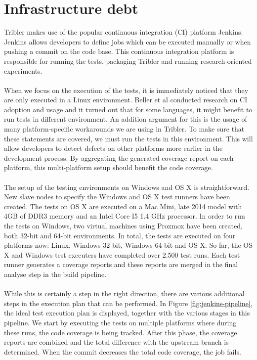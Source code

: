 \section{Infrastructure debt}
Tribler makes use of the popular continuous integration (CI) platform Jenkins. Jenkins allows developers to define jobs which can be executed manually or when pushing a commit on the code base. This continuous integration platform is responsible for running the tests, packaging Tribler and running research-oriented experiments.\\\\
When we focus on the execution of the tests, it is immediately noticed that they are only executed in a Linux environment. Beller et al\cite{beller2016oops} conducted research on CI adoption and usage and it turned out that for some languages, it might benefit to run tests in different environment. An addition argument for this is the usage of many platform-specific workarounds we are using in Tribler. To make sure that these statements are covered, we must run the tests in this environment. This will allow developers to detect defects on other platforms more earlier in the development process. By aggregating the generated coverage report on each platform, this multi-platform setup should benefit the code coverage.\\\\
The setup of the testing environments on Windows and OS X is straightforward. New slave nodes to specify the Windows and OS X test runners have been created. The tests on OS X are executed on a Mac Mini, late 2014 model with 4GB of DDR3 memory and an Intel Core I5 1.4 GHz processor. In order to run the tests on Windows, two virtual machines using Proxmox have been created, both 32-bit and 64-bit environments. In total, the tests are executed on four platforms now: Linux, Windows 32-bit, Windows 64-bit and OS X. So far, the OS X and Windows test executers have completed over 2.500 test runs. Each test runner generates a coverage reports and these reports are merged in the final analyse step in the build pipeline.\\\\
While this is certainly a step in the right direction, there are various additional steps in the execution plan that can be performed. In Figure \ref{fig:jenkins-pipeline}, the ideal test execution plan is displayed, together with the various stages in this pipeline. We start by executing the tests on multiple platforms where during these runs, the code coverage is being tracked. After this phase, the coverage reports are combined and the total difference with the upstream branch is determined. When the commit decreases the total code coverage, the job fails.\\

